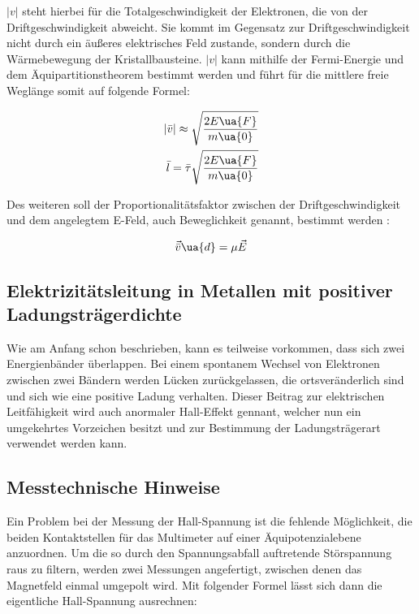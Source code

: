 $|v|$ steht hierbei für die Totalgeschwindigkeit der Elektronen, die von der
Driftgeschwindigkeit abweicht. Sie kommt im Gegensatz zur Driftgeschwindigkeit
nicht durch ein äußeres elektrisches Feld zustande, sondern durch die Wärmebewegung
der Kristallbausteine. $|v|$ kann mithilfe der Fermi-Energie und dem Äquipartitionstheorem
bestimmt werden und führt für die mittlere freie Weglänge somit auf folgende Formel:

\begin{align}
  |\bar{v}| \approx \sqrt{\frac{2E\ua{F}}{m\ua{0}}} \\
  \bar{l} = \bar{\tau} \sqrt{\frac{2E\ua{F}}{m\ua{0}}}
\end{align}

Des weiteren soll der Proportionalitätsfaktor zwischen der Driftgeschwindigkeit
und dem angelegtem E-Feld, auch Beweglichkeit genannt, bestimmt werden :

\begin{equation}
  \vec{\bar{v}}\ua{d} = \mu\vec{E}
\end{equation}

\subsection{Elektrizitätsleitung in Metallen mit positiver Ladungsträgerdichte}

Wie am Anfang schon beschrieben, kann es teilweise vorkommen, dass sich zwei
Energienbänder überlappen. Bei einem spontanem Wechsel von Elektronen zwischen zwei
Bändern werden Lücken zurückgelassen, die ortsveränderlich sind und sich wie eine
positive Ladung verhalten. Dieser Beitrag zur elektrischen Leitfähigkeit wird
auch anormaler Hall-Effekt gennant, welcher nun ein umgekehrtes Vorzeichen besitzt
und zur Bestimmung der Ladungsträgerart verwendet werden kann.

\subsection{Messtechnische Hinweise}

Ein Problem bei der Messung der Hall-Spannung ist die fehlende Möglichkeit, die
beiden Kontaktstellen für das Multimeter auf einer Äquipotenzialebene anzuordnen.
Um die so durch den Spannungsabfall auftretende Störspannung raus zu filtern,
werden zwei Messungen angefertigt, zwischen denen das Magnetfeld einmal umgepolt
wird. Mit folgender Formel lässt sich dann die eigentliche Hall-Spannung ausrechnen:

